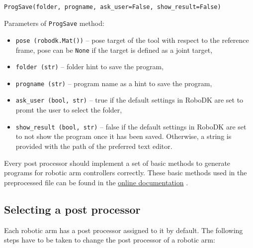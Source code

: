 \begin{verbatim}

ProgSave(folder, progname, ask_user=False, show_result=False)

\end{verbatim}


Parameters of \texttt{ProgSave} method:

\begin{itemize}

\item \texttt{pose (robodk.Mat())} -- pose target of the tool with respect to the reference frame, pose can be \texttt{None} if the target is defined as a joint target,

\item \texttt{folder (str)} -- folder hint to save the program,

\item \texttt{progname (str)} -- program name as a hint to save the program,

\item \texttt{ask_user (bool, str)} -- true if the default settings in RoboDK are set to promt the user to select the folder, 

\item \texttt{show_result (bool, str)} -- false if the default settings in RoboDK are set to not show the program once it has been saved. Otherwise, a string is provided with the path of the preferred text editor.

\end{itemize}

 Every post processor should implement a set of basic methods to generate programs for robotic arm controllers correctly. These basic  methods used in the preprocessed file can be found in the \href{https://robodk.com/doc/en/PythonAPI/postprocessor.html#post-processor-methods}{online documentation} \cite{postmethods}.


\subsection{Selecting a post processor}

Each robotic arm has a post processor assigned to it by default. The following steps have to be taken to change the post processor of a robotic arm:


